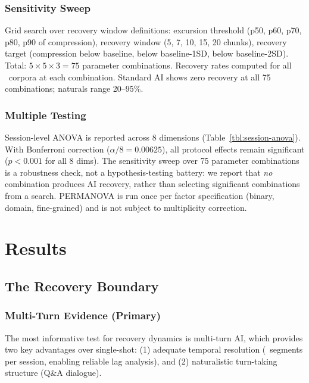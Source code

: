 \documentclass[11pt]{article}
\begin{document}
\subsubsection{Sensitivity Sweep}

Grid search over recovery window definitions: excursion threshold (p50, p60, p70, p80, p90 of compression), recovery window (5, 7, 10, 15, 20 chunks), recovery target (compression below baseline, below baseline-1SD, below baseline-2SD). Total: $5 \times 5 \times 3 = 75$ parameter combinations. Recovery rates computed for all \nCorpora\ corpora at each combination. Standard AI shows zero recovery at all 75 combinations; naturals range 20--95\%.

\subsubsection{Multiple Testing}

Session-level ANOVA is reported across 8 dimensions (Table~\ref{tbl:session-anova}). With Bonferroni correction ($\alpha / 8 = 0.00625$), all protocol effects remain significant ($p < 0.001$ for all 8 dims). The sensitivity sweep over 75 parameter combinations is a robustness check, not a hypothesis-testing battery: we report that \textit{no} combination produces AI recovery, rather than selecting significant combinations from a search. PERMANOVA is run once per factor specification (binary, domain, fine-grained) and is not subject to multiplicity correction.


\section{Results}

\subsection{The Recovery Boundary}

\subsubsection{Multi-Turn Evidence (Primary)}

The most informative test for recovery dynamics is multi-turn AI, which provides two key advantages over single-shot: (1) adequate temporal resolution (\nMultiturnSegments\ segments per session, enabling reliable lag analysis), and (2) naturalistic turn-taking structure (Q\&A dialogue).
\end{document}
